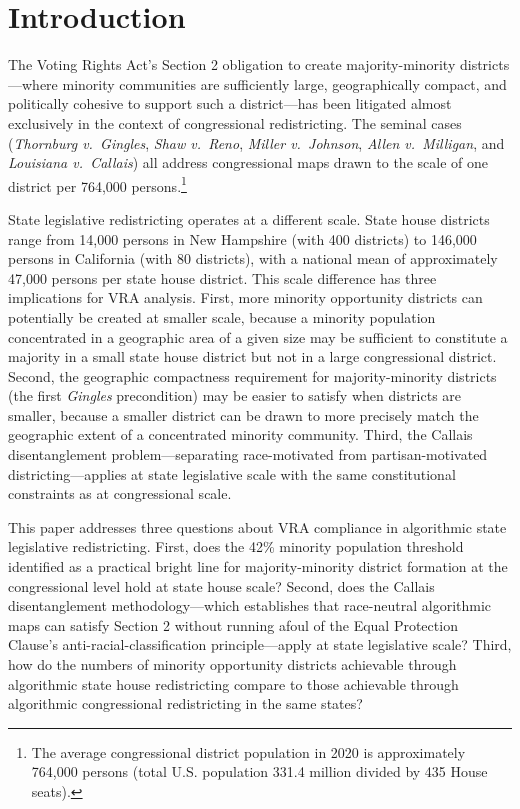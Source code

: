 \section{Introduction}
\label{sec:introduction}

The Voting Rights Act's Section 2 obligation to create majority-minority districts---where minority communities are sufficiently large, geographically compact, and politically cohesive to support such a district---has been litigated almost exclusively in the context of congressional redistricting. The seminal cases (\textit{Thornburg v.\ Gingles}, \textit{Shaw v.\ Reno}, \textit{Miller v.\ Johnson}, \textit{Allen v.\ Milligan}, and \textit{Louisiana v.\ Callais}) all address congressional maps drawn to the scale of one district per 764,000 persons.\footnote{The average congressional district population in 2020 is approximately 764,000 persons (total U.S. population 331.4 million divided by 435 House seats).}

State legislative redistricting operates at a different scale. State house districts range from 14,000 persons in New Hampshire (with 400 districts) to 146,000 persons in California (with 80 districts), with a national mean of approximately 47,000 persons per state house district. This scale difference has three implications for VRA analysis. First, more minority opportunity districts can potentially be created at smaller scale, because a minority population concentrated in a geographic area of a given size may be sufficient to constitute a majority in a small state house district but not in a large congressional district. Second, the geographic compactness requirement for majority-minority districts (the first \textit{Gingles} precondition) may be easier to satisfy when districts are smaller, because a smaller district can be drawn to more precisely match the geographic extent of a concentrated minority community. Third, the Callais disentanglement problem---separating race-motivated from partisan-motivated districting---applies at state legislative scale with the same constitutional constraints as at congressional scale.

This paper addresses three questions about VRA compliance in algorithmic state legislative redistricting. First, does the 42\% minority population threshold identified as a practical bright line for majority-minority district formation at the congressional level \citep{dellaLibera2026threshold} hold at state house scale? Second, does the Callais disentanglement methodology---which establishes that race-neutral algorithmic maps can satisfy Section 2 without running afoul of the Equal Protection Clause's anti-racial-classification principle---apply at state legislative scale? Third, how do the numbers of minority opportunity districts achievable through algorithmic state house redistricting compare to those achievable through algorithmic congressional redistricting in the same states?

